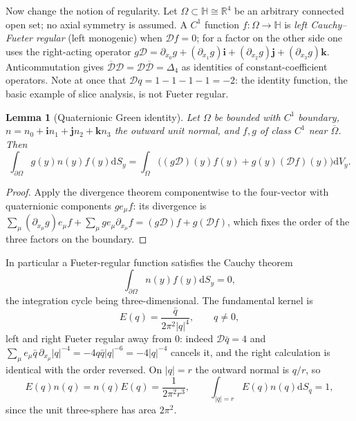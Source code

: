 \documentclass[11pt,a4paper]{article}
\numberwithin{equation}{section}
\newtheorem{lemma}[theorem]{Lemma}
\theoremstyle{definition}
\theoremstyle{remark}
\theoremstyle{plain}
\newcommand{\HH}{\mathbb H}
\newcommand{\RR}{\mathbb R}
\newcommand{\Dop}{\mathcal D}
\newcommand{\lap}{\Delta_4}
\newcommand{\Om}{\Omega}
\newcommand{\abs}[1]{\lvert #1\rvert}
\newcommand{\dd}{\mathrm d}
\begin{document}
Now change the notion of regularity. Let $\Om\subset\HH\cong\RR^4$ be an
arbitrary connected open set; no axial symmetry is assumed. A $C^1$ function
$f:\Om\to\HH$ is \emph{left Cauchy--Fueter regular} (left monogenic) when
$\Dop f=0$; for a factor on the other side one uses the right-acting operator
$g\Dop=\partial_{x_0}g+(\partial_{x_1}g)\mathbf i+(\partial_{x_2}g)\mathbf j
+(\partial_{x_3}g)\mathbf k$. Anticommutation gives
$\overline{\Dop}\Dop=\Dop\overline{\Dop}=\lap$ as identities of
constant-coefficient operators. Note at once that $\Dop q=1-1-1-1=-2$: the
identity function, the basic example of slice analysis, is not Fueter regular.

\begin{lemma}[Quaternionic Green identity]
\label{a:lem:green}
Let $\Om$ be bounded with $C^1$ boundary, $n=n_0+\mathbf in_1+\mathbf jn_2
+\mathbf kn_3$ the outward unit normal, and $f,g$ of class $C^1$ near
$\overline\Om$. Then
\begin{equation}
 \int_{\partial\Om}g(y)n(y)f(y)\dd S_y
 =\int_\Om\bigl((g\Dop)(y)f(y)+g(y)(\Dop f)(y)\bigr)\dd V_y .
 \label{a:eq:green}
\end{equation}
\end{lemma}

\begin{proof}
Apply the divergence theorem componentwise to the four-vector with
quaternionic components $ge_\mu f$: its divergence is
$\sum_\mu(\partial_{x_\mu}g)e_\mu f+\sum_\mu ge_\mu\partial_{x_\mu}f
=(g\Dop)f+g(\Dop f)$, which fixes the order of the three factors on the
boundary.
\end{proof}

In particular a Fueter-regular function satisfies the Cauchy theorem
\begin{equation}
 \int_{\partial\Om}n(y)f(y)\dd S_y=0,
 \label{a:eq:fueter-cauchy-theorem}
\end{equation}
the integration cycle being three-dimensional. The fundamental kernel is
\begin{equation}
 E(q)=\frac{\bar q}{2\pi^2\abs q^4},\qquad q\ne0,
 \label{a:eq:fueter-kernel}
\end{equation}
left and right Fueter regular away from $0$: indeed $\Dop\bar q=4$ and
$\sum_\mu e_\mu\bar q\,\partial_{x_\mu}\abs q^{-4}=-4q\bar q\abs q^{-6}
=-4\abs q^{-4}$ cancels it, and the right calculation is identical with the
order reversed. On $\abs q=r$ the outward normal is $q/r$, so
\begin{equation}
 E(q)n(q)=n(q)E(q)=\frac1{2\pi^2r^3},
 \qquad \int_{\abs q=r}E(q)n(q)\dd S_q=1,
 \label{a:eq:kernel-flux}
\end{equation}
since the unit three-sphere has area $2\pi^2$.
\end{document}
